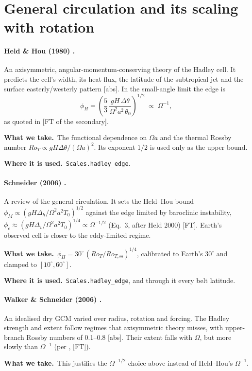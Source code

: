 \documentclass[11pt,a4paper]{article}
\newcommand{\verif}[1]{\textsf{\small[#1]}}
\newcommand{\takes}{\par\noindent\textbf{What we take.}\ }
\newcommand{\used}{\par\noindent\textbf{Where it is used.}\ }
\begin{document}
\section{General circulation and its scaling with rotation}

\paragraph{Held \& Hou (1980) \cite{held1980}.}
An axisymmetric, angular-momentum-conserving theory of the Hadley cell. It predicts the
cell's width, its heat flux, the latitude of the subtropical jet and the surface
easterly/westerly pattern \verif{abs}. In the small-angle limit the edge is
\begin{equation}
  \phi_H = \left(\frac{5}{3}\,\frac{gH\,\Delta\theta}{\Omega^2 a^2\,\theta_0}\right)^{1/2}
  \;\propto\; \Omega^{-1},
\end{equation}
as quoted in \citet[Eq.~56]{showman2009} \verif{FT of the secondary}.
\takes The functional dependence on $\Omega a$ and the thermal Rossby number
$Ro_T \propto gH\Delta\theta/(\Omega a)^2$. Its exponent $1/2$ is used only as the upper
bound.
\used \texttt{Scales.hadley\_edge}.

\paragraph{Schneider (2006) \cite{schneider2006}.}
A review of the general circulation. It sets the Held--Hou bound
$\phi_M \propto (gH\Delta_h/\Omega^2a^2T_0)^{1/2}$ against the edge limited by baroclinic
instability, $\phi_c \approx (gH\Delta_v/\Omega^2a^2T_0)^{1/4} \propto \Omega^{-1/2}$
(Eq.~3, after Held 2000) \verif{FT}. Earth's observed cell is closer to the eddy-limited
regime.
\takes $\phi_H = 30^\circ\,(Ro_T/Ro_{T,\oplus})^{1/4}$, calibrated to Earth's
$30^\circ$ and clamped to $[10^\circ, 60^\circ]$.
\used \texttt{Scales.hadley\_edge}, and through it every belt latitude.

\paragraph{Walker \& Schneider (2006) \cite{walker2006}.}
An idealised dry GCM varied over radius, rotation and forcing. The Hadley strength and
extent follow regimes that axisymmetric theory misses, with upper-branch Rossby numbers of
0.1--0.8 \verif{abs}. Their extent falls with $\Omega$, but more slowly than $\Omega^{-1}$
(per \cite{schneider2006}, \verif{FT}).
\takes This justifies the $\Omega^{-1/2}$ choice above instead of Held--Hou's $\Omega^{-1}$.
\end{document}
